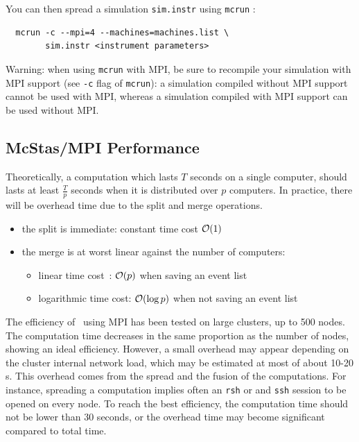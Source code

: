 You can then spread a simulation \verb'sim.instr' using \verb'mcrun' :
\begin{verbatim}
  mcrun -c --mpi=4 --machines=machines.list \
        sim.instr <instrument parameters>
\end{verbatim}

\begin{paragraph}{Warning:} when using \verb'mcrun' with MPI, be sure to
  recompile your simulation with MPI support (see \verb'-c' flag of
  \verb'mcrun'): a simulation compiled without MPI support cannot be used with
  MPI, whereas a simulation compiled with MPI support can be used without MPI.
\end{paragraph}

\subsection{McStas/MPI Performance}

Theoretically, a computation which lasts $T$ seconds on a single computer,
should lasts at least $\frac{T}{p}$ seconds when it is distributed over $p$
computers. In practice, there will be overhead time due to the split and merge
operations.
\begin{itemize}
\item the split is immediate: constant time cost ${\cal O}(1)$
\item the merge is at worst linear against the number of computers:
  \begin{itemize}
  \item linear time cost~: ${\cal O}(p)$ when saving an event list
  \item logarithmic time cost: ${\cal O}(\log{p})$ when not saving an
  event list
  \end{itemize}
\end{itemize}

The efficiency of \MCS\ using MPI has been tested on large clusters, up to 500
nodes.  The computation time decreases in the same proportion as the number of
nodes, showing an ideal efficiency. However, a small overhead may appear
depending on the cluster internal network load, which may be estimated at most
of about 10-20 s.  This overhead comes from the spread and the fusion of the
computations. For instance, spreading a computation implies often an \verb'rsh'
or and \verb'ssh' session to be opened on every node.  To reach the best
efficiency, the computation time should not be lower than 30 seconds, or the
overhead time may become significant compared to total time.

